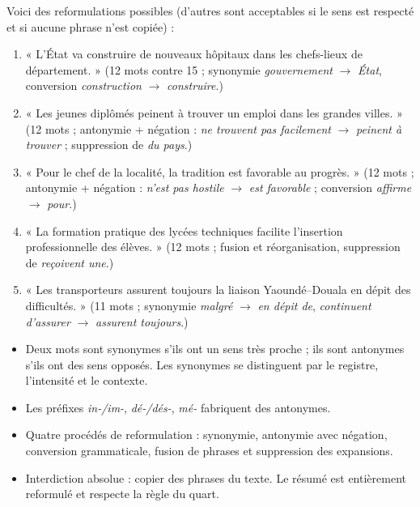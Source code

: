 \documentclass[11pt]{article}
\newcommand{\cle}[1]{{\popxbold\color{popdark}#1}}
\begin{document}
\begin{corrige}
Voici des reformulations possibles (d'autres sont acceptables si le sens est respecté et si aucune phrase n'est copiée) :
\begin{enumerate}
\item « L'État va construire de nouveaux hôpitaux dans les chefs-lieux de département. » (12 mots contre 15 ; synonymie \emph{gouvernement} $\rightarrow$ \emph{État}, conversion \emph{construction} $\rightarrow$ \emph{construire}.)
\item « Les jeunes diplômés peinent à trouver un emploi dans les grandes villes. » (12 mots ; antonymie + négation : \emph{ne trouvent pas facilement} $\rightarrow$ \emph{peinent à trouver} ; suppression de \emph{du pays}.)
\item « Pour le chef de la localité, la tradition est favorable au progrès. » (12 mots ; antonymie + négation : \emph{n'est pas hostile} $\rightarrow$ \emph{est favorable} ; conversion \emph{affirme} $\rightarrow$ \emph{pour}.)
\item « La formation pratique des lycées techniques facilite l'insertion professionnelle des élèves. » (12 mots ; fusion et réorganisation, suppression de \emph{reçoivent une}.)
\item « Les transporteurs assurent toujours la liaison Yaoundé--Douala en dépit des difficultés. » (11 mots ; synonymie \emph{malgré} $\rightarrow$ \emph{en dépit de}, \emph{continuent d'assurer} $\rightarrow$ \emph{assurent toujours}.)
\end{enumerate}
\end{corrige}

\begin{aretenir}
\begin{itemize}
\item Deux mots sont \cle{synonymes} s'ils ont un sens très proche ; ils sont \cle{antonymes} s'ils ont des sens opposés. Les synonymes se distinguent par le registre, l'intensité et le contexte.
\item Les préfixes \emph{in-/im-}, \emph{dé-/dés-}, \emph{mé-} fabriquent des antonymes.
\item Quatre procédés de reformulation : synonymie, antonymie avec négation, conversion grammaticale, fusion de phrases et suppression des expansions.
\item Interdiction absolue : copier des phrases du texte. Le résumé est entièrement reformulé et respecte la règle du quart.
\end{itemize}
\end{aretenir}
\end{document}
